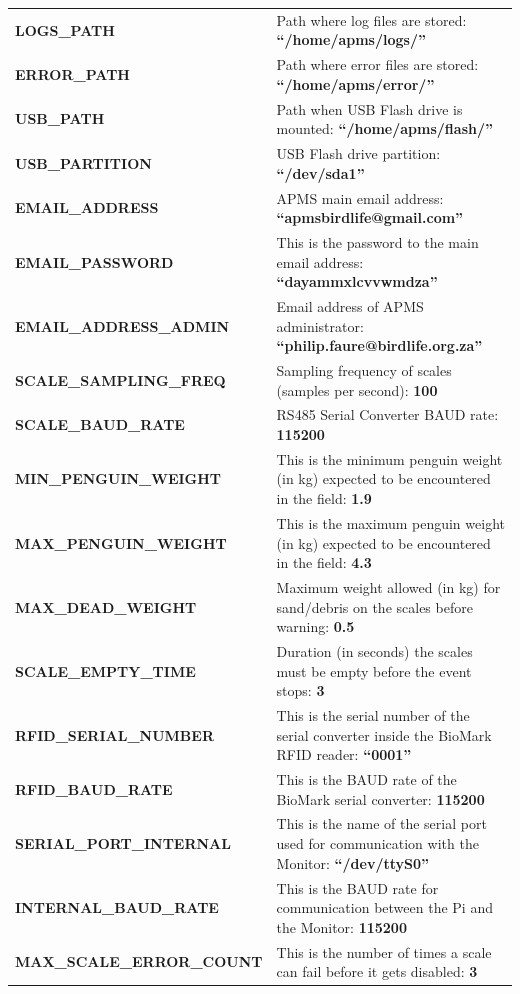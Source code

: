 \documentclass[
  letterpaper,
]{scrbook}
\begin{document}
\begin{longtable}[]{@{}
  >{\raggedright\arraybackslash}p{}
  >{\raggedright\arraybackslash}p{}@{}}
\textbf{LOGS\_PATH} & Path where log files are stored:
\textbf{``/home/apms/logs/''} \\
\textbf{ERROR\_PATH} & Path where error files are stored:
\textbf{``/home/apms/error/''} \\
\textbf{USB\_PATH} & Path when USB Flash drive is mounted:
\textbf{``/home/apms/flash/''} \\
\textbf{USB\_PARTITION} & USB Flash drive partition:
\textbf{``/dev/sda1''} \\
\textbf{EMAIL\_ADDRESS} & APMS main email address:
\textbf{``apmsbirdlife@gmail.com''} \\
\textbf{EMAIL\_PASSWORD} & This is the password to the main email
address: \textbf{``dayammxlcvvwmdza''} \\
\textbf{EMAIL\_ADDRESS\_ADMIN} & Email address of APMS administrator:
\textbf{``philip.faure@birdlife.org.za''} \\
\textbf{SCALE\_SAMPLING\_FREQ} & Sampling frequency of scales (samples
per second): \textbf{100} \\
\textbf{SCALE\_BAUD\_RATE} & RS485 Serial Converter BAUD rate:
\textbf{115200} \\
\textbf{MIN\_PENGUIN\_WEIGHT} & This is the minimum penguin weight (in
kg) expected to be encountered in the field: \textbf{1.9} \\
\textbf{MAX\_PENGUIN\_WEIGHT} & This is the maximum penguin weight (in
kg) expected to be encountered in the field: \textbf{4.3} \\
\textbf{MAX\_DEAD\_WEIGHT} & Maximum weight allowed (in kg) for
sand/debris on the scales before warning: \textbf{0.5} \\
\textbf{SCALE\_EMPTY\_TIME} & Duration (in seconds) the scales must be
empty before the event stops: \textbf{3} \\
\textbf{RFID\_SERIAL\_NUMBER} & This is the serial number of the serial
converter inside the BioMark RFID reader: \textbf{``0001''} \\
\textbf{RFID\_BAUD\_RATE} & This is the BAUD rate of the BioMark serial
converter: \textbf{115200} \\
\textbf{SERIAL\_PORT\_INTERNAL} & This is the name of the serial port
used for communication with the Monitor: \textbf{``/dev/ttyS0''} \\
\textbf{INTERNAL\_BAUD\_RATE} & This is the BAUD rate for communication
between the Pi and the Monitor: \textbf{115200} \\
\textbf{MAX\_SCALE\_ERROR\_COUNT} & This is the number of times a scale
can fail before it gets disabled: \textbf{3} \\

\end{longtable}
\end{document}
